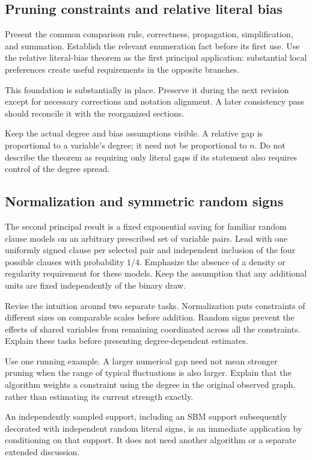 \documentclass[11pt,a4paper]{article}
\begin{document}
\subsection{Pruning constraints and relative literal bias}

Present the common comparison rule, correctness, propagation, simplification,
and summation. Establish the relevant enumeration fact before its first use.
Use the relative literal-bias theorem as the first principal application:
substantial local preferences create useful requirements in the opposite
branches.

This foundation is substantially in place. Preserve it during the next
revision except for necessary corrections and notation alignment. A later
consistency pass should reconcile it with the reorganized sections.

Keep the actual degree and bias assumptions visible. A relative gap is
proportional to a variable's degree; it need not be proportional to $n$.
Do not describe the theorem as requiring only literal gaps if its statement
also requires control of the degree spread.

\subsection{Normalization and symmetric random signs}

The second principal result is a fixed exponential saving for familiar
random clause models on an arbitrary prescribed set of variable pairs.
Lead with one uniformly signed clause per selected pair and independent
inclusion of the four possible clauses with probability $1/4$. Emphasize
the absence of a density or regularity requirement for these models.
Keep the assumption that any additional units are fixed independently of
the binary draw.

Revise the intuition around two separate tasks. Normalization puts
constraints of different sizes on comparable scales before addition.
Random signs prevent the effects of shared variables from remaining
coordinated across all the constraints. Explain these tasks before
presenting degree-dependent estimates.

Use one running example. A larger numerical gap need not mean stronger
pruning when the range of typical fluctuations is also larger. Explain
that the algorithm weights a constraint using the degree in the original
observed graph, rather than estimating its current strength exactly.

An independently sampled support, including an SBM support subsequently
decorated with independent random literal signs, is an immediate
application by conditioning on that support. It does not need another
algorithm or a separate extended discussion.
\end{document}
